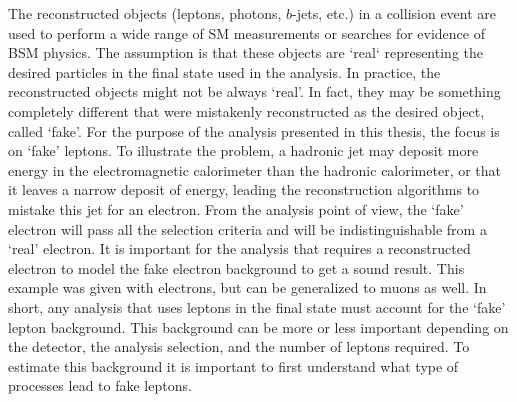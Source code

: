 The reconstructed objects (leptons, photons, $b$-jets, etc.) in a collision event are used to perform a wide range of SM measurements 
or searches for evidence of BSM physics. The assumption is that these objects are `real` representing the desired particles 
in the final state used in the analysis. 
In practice, the reconstructed objects might not be always `real'. In fact, they may be something completely different that
were mistakenly reconstructed as the desired object, called `fake'. 
For the purpose of the analysis presented in this thesis, the focus is on `fake' leptons. 
To illustrate the problem, a hadronic jet may deposit more energy in the electromagnetic calorimeter than the hadronic calorimeter, 
or that it leaves a narrow deposit of energy, leading the reconstruction algorithms to mistake this jet for an electron.
From the analysis point of view, the `fake' electron will pass all the selection criteria and will be indistinguishable from 
a `real' electron. 
It is important for the analysis that requires a reconstructed electron to model the fake electron background to get a sound 
result. This example was given with electrons, but can be generalized to muons as well. 
In short, any analysis that uses leptons in the final state must account for the `fake' lepton background. 
This background can be more or less important depending on the detector, the analysis selection, and the number of leptons required. 
To estimate this background it is important to first understand what type of processes lead to fake leptons.
